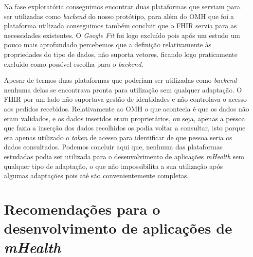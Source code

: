 Na fase exploratória conseguimos encontrar duas plataformas que serviam para ser utilizadas como \textit{backend} do nosso protótipo, para além do \gls{OMH} que foi a plataforma utilizada conseguimos também concluir que o \gls{FHIR} servia para as necessidades existentes. O \textit{Google Fit} foi logo excluído pois após um estudo um pouco mais aprofundado percebemos que a definição relativamente às propriedades do tipo de dados, não suporta vetores, ficando logo praticamente excluído como possível escolha para o \textit{backend}.\par 
Apesar de termos duas plataformas que poderiam ser utilizadas como \textit{backend} nenhuma delas se encontrava pronta para utilização sem qualquer adaptação. O \gls{FHIR} por um lado não suportava gestão de identidades e não controlava o acesso aos pedidos recebidos. Relativamente ao \gls{OMH} o que acontecia é que os dados não eram validados, e os dados inseridos eram proprietários, ou seja, apenas a pessoa que fazia a inserção dos dados recolhidos os podia voltar a consultar, isto porque era apenas utilizado o \textit{token} de acesso para identificar de que pessoa seria os dados consultados.
Podemos concluir aqui que, nenhuma das plataformas estudadas podia ser utilizada para o desenvolvimento de aplicações \textit{mHealth} sem qualquer tipo de adaptação, o que não impossibilita a sua utilização após algumas adaptações pois até são convenientemente completas.

\section{Recomendações para o desenvolvimento de aplicações de \textit{mHealth}}


